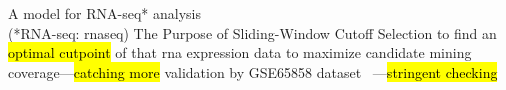 \documentclass[
paper=landscape,
paper=160mm:90mm, %
fontsize=11pt, %
pagesize, %
parskip=half-, %
]{scrartcl} %
\theoremstyle{mythmstyle} %
\begin{document}
\begin{minipage}[c]{0.45\linewidth}

\begin{outline}
\1 A model for RNA-seq* analysis\\  {\tiny (*RNA-seq: \acrlong{rnaseq})} %
\1 The Purpose of Sliding-Window Cutoff Selection
    \2 to find an \hl{optimal cutpoint} of that \acrshort{rna} expression data 
    \2 to maximize candidate mining coverage---\hl{catching more}
    \2 validation by GSE65858 dataset~\autocite{Wichmann2015} ---\hl{stringent checking}
\end{outline}
\end{minipage}
\hfill
\end{document}
